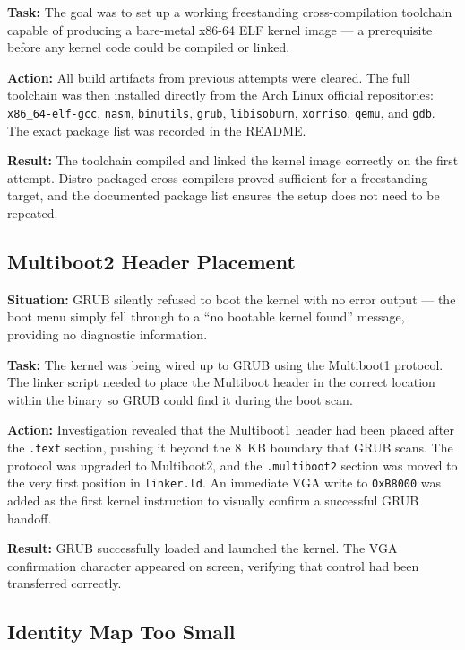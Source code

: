\documentclass[12pt,a4paper]{article}
\begin{document}
\textbf{Task:} The goal was to set up a working freestanding cross-compilation toolchain capable of producing a bare-metal x86-64 ELF kernel image --- a prerequisite before any kernel code could be compiled or linked.

\textbf{Action:} All build artifacts from previous attempts were cleared. The full toolchain was then installed directly from the Arch Linux official repositories: \texttt{x86\_64-elf-gcc}, \texttt{nasm}, \texttt{binutils}, \texttt{grub}, \texttt{libisoburn}, \texttt{xorriso}, \texttt{qemu}, and \texttt{gdb}. The exact package list was recorded in the README.

\textbf{Result:} The toolchain compiled and linked the kernel image correctly on the first attempt. Distro-packaged cross-compilers proved sufficient for a freestanding target, and the documented package list ensures the setup does not need to be repeated.

\subsection{Multiboot2 Header Placement}

\textbf{Situation:} GRUB silently refused to boot the kernel with no error output --- the boot menu simply fell through to a ``no bootable kernel found'' message, providing no diagnostic information.

\textbf{Task:} The kernel was being wired up to GRUB using the Multiboot1 protocol. The linker script needed to place the Multiboot header in the correct location within the binary so GRUB could find it during the boot scan.

\textbf{Action:} Investigation revealed that the Multiboot1 header had been placed after the \texttt{.text} section, pushing it beyond the 8~KB boundary that GRUB scans. The protocol was upgraded to Multiboot2, and the \texttt{.multiboot2} section was moved to the very first position in \texttt{linker.ld}. An immediate VGA write to \texttt{0xB8000} was added as the first kernel instruction to visually confirm a successful GRUB handoff.

\textbf{Result:} GRUB successfully loaded and launched the kernel. The VGA confirmation character appeared on screen, verifying that control had been transferred correctly.

\subsection{Identity Map Too Small}
\end{document}

